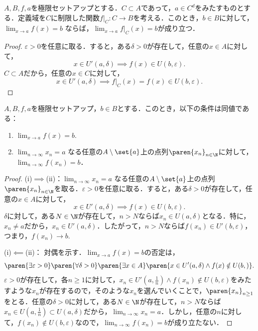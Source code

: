 \documentclass[a4paper,10pt]{ltjsarticle}
\begin{document}
\begin{MyProposition}
  \(A, B, f, a\)を極限セットアップとする．\(C \subset A\)であって，\(a \in C^d\)をみたすものとする．定義域を\(C\)に制限した関数\(f|_C : C \to B\)を考える．このとき，\(b \in B\)に対して，\(\lim_{x \to a} f(x) = b\) ならば，\(\lim_{x \to a} f|_C(x) = b\)が成り立つ．
\end{MyProposition}
\begin{proof}
  \(\varepsilon > 0\)を任意に取る．すると，ある\(\delta > 0\)が存在して，任意の\(x \in A\)に対して，
  \[ x \in U'(a, \delta) \implies f(x) \in U(b, \varepsilon). \]
  \(C \subset A\)だから，任意の\(x \in C\)に対して，
  \[ x \in U'(a, \delta) \implies f|_C(x) = f(x) \in U(b, \varepsilon). \]
\end{proof}

\begin{MyTheorem}
  \(A, B, f, a\)を極限セットアップ，\(b \in B\)とする．このとき，以下の条件は同値である：
  \begin{enumerate}
    \item \(\lim_{x \to a} f(x) = b\).
    \item \(\lim_{n\to\infty}x_n=a\) なる任意の\(A\setminus\set{a}\)上の点列\(\paren{x_n}_{n\in\N}\)に対して，\(\lim_{n\to\infty}f(x_n) = b\)．
  \end{enumerate}
\end{MyTheorem}

\begin{proof}
  (i)\(\implies\)(ii)：\(\lim_{n\to\infty}x_n=a\) なる任意の\(A\setminus\set{a}\)上の点列\(\paren{x_n}_{n\in\N}\)を取る．\(\varepsilon > 0\)を任意に取る．すると，ある\(\delta > 0\)が存在して，任意の\(x \in A\)に対して，
  \[ x \in U'(a, \delta) \implies f(x) \in U(b, \varepsilon). \]
  \(\delta\)に対して，ある\(N \in \N\)が存在して，\(n > N\)ならば\(x_n \in U(a, \delta)\)となる．特に，\(x_n \ne a\)だから，\(x_n \in U'(a, \delta)\)．したがって，\(n > N\)ならば\(f(x_n) \in U'(b, \varepsilon)\)，つまり，\(f(x_n) \to b\).

  (i)\(\impliedby\)(ii)： 対偶を示す．\(\lim_{x \to a} f(x) = b\)の否定は，
  \[ \paren{\exists \varepsilon > 0}\paren{\forall \delta > 0}\paren{\exists x \in A}\paren{x \in U'(a, \delta) \land f(x) \notin U(b, )}.\]
  \(\varepsilon > 0\)が存在して，各\(n \ge 1\)に対して，\(x_n\in U'(a, \frac1n)\land f(x_n)\notin U(b, \varepsilon)\)をみたすような\(x_n\)が存在するので，そのような\(x_n\)を選んでいくことで，\(\paren{x_n}_{n\ge1}\)をとる．任意の\(\delta > 0\)に対して，ある\(N \in \N\)が存在して，\(n > N\)ならば\(x_n \in U(a, \frac1n) \subset U(a, \delta)\)だから，\(\lim_{n\to\infty}x_n=a\)．しかし，任意の\(n\)に対して，\(f(x_n)\notin U(b, \varepsilon)\)なので，\(\lim_{n\to\infty}f(x_n) = b\)が成り立たない．
\end{proof}
\end{document}
